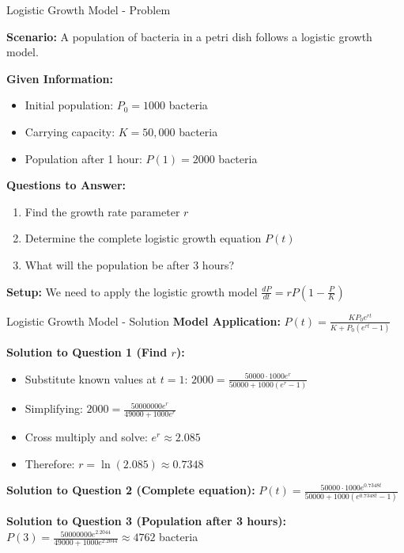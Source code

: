 \documentclass[10pt,aspectratio=169]{beamer}
\begin{document}
\begin{frame}{Logistic Growth Model - Problem}
    \begin{problembox}
        \textbf{Scenario:} A population of bacteria in a petri dish follows a logistic growth model.
        
        \textbf{Given Information:}
        \begin{itemize}
            \item Initial population: $P_0 = 1000$ bacteria
            \item Carrying capacity: $K = 50,000$ bacteria
            \item Population after 1 hour: $P(1) = 2000$ bacteria
        \end{itemize}
        
        \textbf{Questions to Answer:}
        \begin{enumerate}
            \item Find the growth rate parameter $r$
            \item Determine the complete logistic growth equation $P(t)$
            \item What will the population be after 3 hours?
        \end{enumerate}
        
        \textbf{Setup:} We need to apply the logistic growth model $\frac{dP}{dt} = rP\left(1-\frac{P}{K}\right)$
    \end{problembox}
\end{frame}

\begin{frame}{Logistic Growth Model - Solution}
    \textbf{Model Application:} $P(t) = \frac{KP_0 e^{rt}}{K + P_0 (e^{rt} - 1)}$
    
    \textbf{Solution to Question 1 (Find $r$):}
    \begin{itemize}
        \item Substitute known values at $t=1$: $2000 = \frac{50000 \cdot 1000 e^{r}}{50000 + 1000 (e^{r} - 1)}$
        \item Simplifying: $2000 = \frac{50000000 e^{r}}{49000 + 1000 e^{r}}$
        \item Cross multiply and solve: $e^r \approx 2.085$
        \item Therefore: $r = \ln(2.085) \approx 0.7348$
    \end{itemize}
    
    \textbf{Solution to Question 2 (Complete equation):}
    $P(t) = \frac{50000 \cdot 1000 e^{0.7348t}}{50000 + 1000 (e^{0.7348t} - 1)}$
    
    \textbf{Solution to Question 3 (Population after 3 hours):}
    $P(3) = \frac{50000000 e^{2.2044}}{49000 + 1000 e^{2.2044}} \approx 4762$ bacteria
\end{frame}
\end{document}
